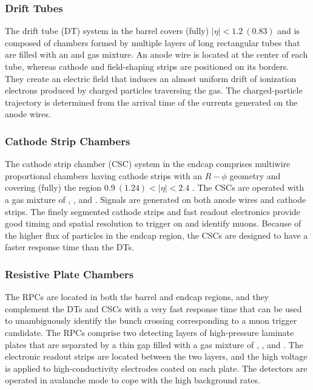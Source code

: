 \subsubsection{\label{subsubsec:exp_CMS_Muon_DTs}Drift Tubes}
\noindent The drift tube (DT) system in the barrel covers (fully) $|\eta| < 1.2 \: (0.83)$ and is composed of chambers formed by multiple layers of long rectangular tubes that are filled with an  and  gas mixture. An anode wire is located at the center of each tube, whereas cathode and field-shaping strips are positioned on its borders. They create an electric field that induces an almost uniform drift of ionization electrons produced by charged particles traversing the gas. The charged-particle trajectory is determined from the arrival time of the currents generated on the anode wires.

\subsubsection{\label{subsubsec:exp_CMS_Muon_CSCs}Cathode Strip Chambers}
\noindent The cathode strip chamber (CSC) system in the endcap comprises multiwire proportional chambers having cathode strips with an $R-\phi$ geometry and covering (fully) the region $0.9 \: (1.24) < |\eta| < 2.4$ . The CSCs are operated with a gas mixture of , , and . Signals are generated on both anode wires and cathode strips. The finely segmented cathode strips and fast readout electronics provide good timing and spatial resolution to trigger on and identify muons. Because of the higher flux of particles in the endcap region, the CSCs are designed to have a faster response time than the DTs.

\subsubsection{\label{subsubsec:exp_CMS_Muon_RPCs}Resistive Plate Chambers}
\noindent The RPCs are located in both the barrel and endcap regions, and they complement the DTs and CSCs with a very fast response time that can be used to unambiguously identify the bunch crossing corresponding to a muon trigger candidate. The RPCs comprise two detecting layers of high-pressure laminate plates that are separated by a thin gap filled with a gas mixture of , , and . The electronic readout strips are located between the two layers, and the high voltage is applied to high-conductivity electrodes coated on each plate. The detectors are operated in avalanche mode to cope with the high background rates.

